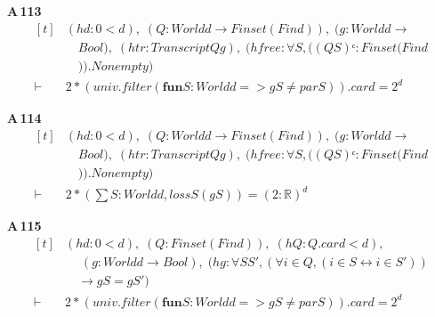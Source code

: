 \noindent\textbf{A\,113}\quad{}
{\footnotesize\[ \begin{aligned}[t]
&(\mathit{hd} : 0 < \mathit{d}),\; (\mathit{Q} : \mathit{World} \mathit{d} \to \mathit{Finset} (\mathit{Fin} \mathit{d})),\; (\mathit{g} : \mathit{World} \mathit{d} \to\\
&\quad \mathit{Bool}),\; (\mathit{htr} : \mathit{Transcript} \mathit{Q} \mathit{g}),\; (\mathit{hfree} : \forall \mathit{S}, ((\mathit{Q} \mathit{S})ᶜ : \mathit{Finset} (\mathit{Fin} \mathit{d}\\
&\quad )).\mathit{Nonempty})\\
\vdash\;&2 * (\mathit{univ}.\mathit{filter} (\mathbf{fun} \mathit{S} : \mathit{World} \mathit{d} => \mathit{g} \mathit{S} \neq \mathit{par} \mathit{S})).\mathit{card} = 2 ^{\mathit{d}}
\end{aligned} \]}

\noindent\textbf{A\,114}\quad{}
{\footnotesize\[ \begin{aligned}[t]
&(\mathit{hd} : 0 < \mathit{d}),\; (\mathit{Q} : \mathit{World} \mathit{d} \to \mathit{Finset} (\mathit{Fin} \mathit{d})),\; (\mathit{g} : \mathit{World} \mathit{d} \to\\
&\quad \mathit{Bool}),\; (\mathit{htr} : \mathit{Transcript} \mathit{Q} \mathit{g}),\; (\mathit{hfree} : \forall \mathit{S}, ((\mathit{Q} \mathit{S})ᶜ : \mathit{Finset} (\mathit{Fin} \mathit{d}\\
&\quad )).\mathit{Nonempty})\\
\vdash\;&2 * (\textstyle\sum \mathit{S} : \mathit{World} \mathit{d}, \mathit{loss} \mathit{S} (\mathit{g} \mathit{S})) = (2 : \mathbb{R} ) ^{\mathit{d}}
\end{aligned} \]}

\noindent\textbf{A\,115}\quad{}
{\footnotesize\[ \begin{aligned}[t]
&(\mathit{hd} : 0 < \mathit{d}),\; (\mathit{Q} : \mathit{Finset} (\mathit{Fin} \mathit{d})),\; (\mathit{hQ} : \mathit{Q}.\mathit{card} < \mathit{d}),\\
&\quad \; (\mathit{g} : \mathit{World} \mathit{d} \to \mathit{Bool}),\; (\mathit{hg} : \forall \mathit{S} \mathit{S'}, (\forall \mathit{i} \in \mathit{Q}, (\mathit{i} \in \mathit{S} \leftrightarrow \mathit{i} \in \mathit{S'}))\\
&\quad \to \mathit{g} \mathit{S} = \mathit{g} \mathit{S'})\\
\vdash\;&2 * (\mathit{univ}.\mathit{filter} (\mathbf{fun} \mathit{S} : \mathit{World} \mathit{d} => \mathit{g} \mathit{S} \neq \mathit{par} \mathit{S})).\mathit{card} = 2 ^{\mathit{d}}
\end{aligned} \]}

